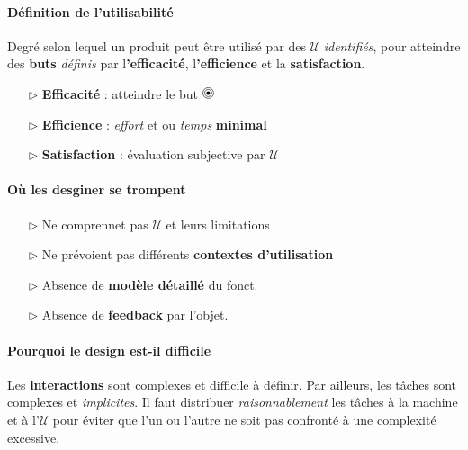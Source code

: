 \documentclass[2pt]{report}
\newcommand{\target}{%
  \begin{tikzpicture}[scale=0.5]
    \fill[black] (0,0) circle (0.1);
    \draw (0,0) circle (0.2);
    \draw (0,0) circle (0.3);
  \end{tikzpicture}%
}
\begin{document}
\begin{multicols*}{3}
    \paragraph{Définition de l'utilisabilité}
    Degré selon lequel un produit peut être utilisé par des 
    $\mathcal{U}$ \textit{identifiés}, pour atteindre des 
    \textbf{buts} \textit{définis} par 
    l\textbf{'efficacité}, l\textbf{'efficience} et 
    la \textbf{satisfaction}.   
    \begin{itemize}
        \item [$\rhd$] \textbf{ Efficacité} : atteindre le but \;  $\target$
        \item[$\rhd$] \textbf{ Efficience} : \textit{effort} 
            et ou \textit{temps} \textbf{minimal} \;  
        \item[$\rhd $] \textbf{ Satisfaction} :  
            évaluation subjective par $\mathcal{U}$
    \end{itemize}

    \paragraph{Où les desginer se trompent}  
    \begin{itemize}
        \item[$\rhd$] Ne comprennet pas $\mathcal{U}$ et leurs limitations
        \item[$\rhd$] Ne prévoient pas différents \textbf{contextes d'utilisation}  
        \item[$\rhd$] Absence de \textbf{modèle détaillé} du fonct.        
        \item[$\rhd$] Absence de \textbf{feedback} par l'objet.        
    \end{itemize}

    \paragraph{Pourquoi le design est-il difficile}
    Les \textbf{interactions} sont complexes et difficile à définir. Par ailleurs, les tâches 
    sont complexes et \textit{implicites}. Il faut distribuer \textit{raisonnablement}
    les tâches à la machine et à l'$\mathcal{U}$ pour éviter que l'un ou l'autre 
    ne soit pas confronté à une complexité excessive. 
    










        

 
 \end{multicols*}
\end{document}
